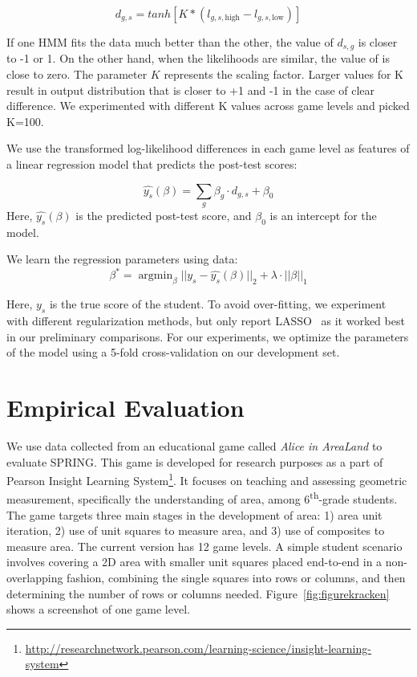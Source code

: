 \documentclass{sigchi}
\def\algname{SPRING\xspace}
\DeclareMathOperator*{\argmin}{argmin}
\begin{document}
	\begin{equation}
	d_{g,s} = tanh[ K * (l_{g, s, \text{high}} - l_{g, s, \text{low}})]
	\end{equation}
	
 	If one HMM fits the data much better than the other, the value of $d_{s,g}$ is closer to -1 or 1.
	On the other hand, when the likelihoods are similar,  the value of is close to zero. 
	The parameter $K$ represents the scaling factor.
	Larger values for K result in output distribution that is closer to +1 and -1 in the case of clear difference.
	We experimented with different K values across game levels and picked K=100.

	We use the transformed log-likelihood differences in each game level as features of a linear regression model that predicts the post-test scores:

	\begin{equation}
	\hat {y_s}(\beta) =   \sum_g \beta_g \cdot d_{g,s}  + \beta_0
	\end{equation}
	Here, $\hat {y_s}(\beta)$ is the predicted post-test score, and $\beta_0$ is an intercept for the  model.  
	
	We learn the regression parameters using data:
	\begin{equation}
	\beta^* = \argmin_\beta || y_s - \hat{y_s}(\beta)  ||_2 + \lambda \cdot || \beta ||_1
	\end{equation}
	
	Here, $y_s$ is the true score of the student.
	To avoid over-fitting, we experiment with different regularization methods, but only report LASSO~\cite{tibshirani1996regression} as it worked best in our preliminary comparisons.
	For our experiments, we optimize the parameters of the model using a 5-fold cross-validation on our development set.

	
	\section{Empirical Evaluation}
	\label{sec:experiments}
	
	
	We use data collected from an educational game called  \textit {Alice in AreaLand} to evaluate \algname.
	This game is developed for research purposes as a part of Pearson Insight Learning System\footnote{\url{http://researchnetwork.pearson.com/learning-science/insight-learning-system}}. 
	It focuses on teaching and assessing geometric measurement, specifically the understanding of area, among 6\textsuperscript{th}-grade students. 
	The game targets three main stages in the development of area: 1) area unit iteration, 2) use of unit squares to measure area, and 3) use of composites to measure area. 
	The current version has 12 game levels. 
	A simple student scenario involves covering a 2D area with smaller unit squares placed end-to-end in a non-overlapping fashion, combining the single squares into rows or columns, and then determining the number of rows or columns needed. 
	Figure~\ref{fig:figurekracken} shows a screenshot of one game level.
	
\end{document}
